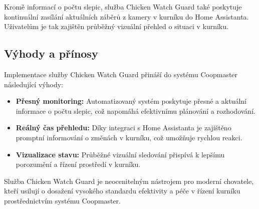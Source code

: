 Kromě informací o počtu slepic, služba Chicken Watch Guard také poskytuje kontinuální zasílání aktuálních záběrů z kamery v kurníku do Home Assistanta.
Uživatelům je tak zajištěn průběžný vizuální přehled o situaci v kurníku.

\subsection*{Výhody a přínosy}

Implementace služby Chicken Watch Guard přináší do systému Coopmaster následující výhody:
\begin{itemize}
    \item \textbf{Přesný monitoring:} Automatizovaný systém poskytuje přesné a aktuální informace o počtu slepic, což napomáhá efektivnímu plánování a rozhodování.
    \item \textbf{Reálný čas přehledu:} Díky integraci s Home Assistanta je zajištěno promptní informování o změnách v kurníku, což umožňuje rychlou reakci.
    \item \textbf{Vizualizace stavu:} Průběžné vizuální sledování přispívá k lepšímu porozumění a řízení prostředí v kurníku.
\end{itemize}

Služba Chicken Watch Guard je neocenitelným nástrojem pro moderní chovatele, kteří usilují o dosažení vysokého standardu efektivity a péče v řízení kurníku prostřednictvím systému Coopmaster.
